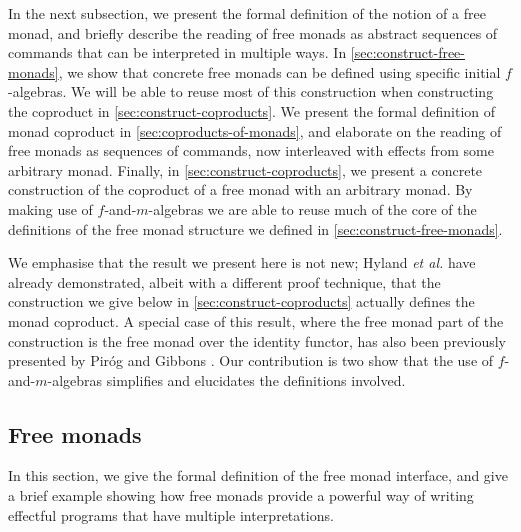 \documentclass{jfp1}
\begin{document}
In the next subsection, we present the formal definition of the notion of a free
monad, and briefly describe the reading of free monads as abstract
sequences of commands that can be interpreted in multiple ways. In
\autoref{sec:construct-free-monads}, we show that concrete free monads
can be defined using specific initial $f$-algebras. We will be able to reuse
most of this construction when constructing the coproduct in
\autoref{sec:construct-coproducts}. We present the formal definition of
monad coproduct in \autoref{sec:coproducts-of-monads}, and elaborate
on the reading of free monads as sequences of commands, now
interleaved with effects from some arbitrary monad. Finally, in
\autoref{sec:construct-coproducts}, we present a concrete construction
of the coproduct of a free monad with an arbitrary monad. By making
use of $f$-and-$m$-algebras we are able to reuse much of the core of
the definitions of the free monad structure we defined in
\autoref{sec:construct-free-monads}.

We emphasise that the result we present here is not new; Hyland
\emph{et al.} have already demonstrated, albeit with a different proof
technique, that the construction we give below in
\autoref{sec:construct-coproducts} actually defines the monad
coproduct. A special case of this result, where the free monad part of
the construction is the free monad over the identity functor, has also
been previously presented by Pir{\'o}g and Gibbons
\cite{pirog12tracing}. Our contribution is two show that the use of
$f$-and-$m$-algebras simplifies and elucidates the definitions
involved.

\subsection{Free monads}
\label{sec:free-monads}

In this section, we give the formal definition of the free monad
interface, and give a brief example showing how free monads provide a
powerful way of writing effectful programs that have multiple
interpretations.
\end{document}
